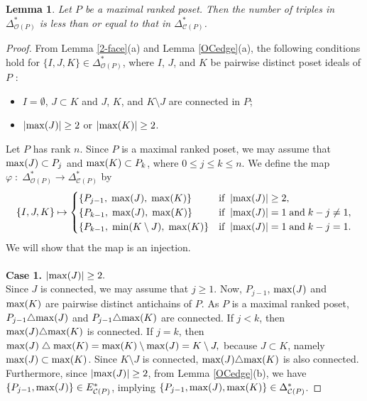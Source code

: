 \documentclass[12pt]{amsart}
\newtheorem{Lemma}[Theorem]{Lemma}
\theoremstyle{definition}
\let\phi=\varphi
\begin{document}
\begin{Lemma}\label{triangle inequality} 
Let $P$ be a maximal ranked poset.
Then the number of triples in $\Delta^{*}_{\mathcal{O}(P)}$
is less than or equal to that in $\Delta^{*}_{\mathcal{C}(P)}$.
\end{Lemma}

\begin{proof}
From Lemma \ref{2-face}(a) and Lemma \ref{OCedge}(a), the following conditions hold for $\{I,J,K\} \in \Delta^{*}_{\mathcal{O}(P)}$, where $I$, $J$, and $K$ be pairwise distinct poset ideals of $P$
:
\begin{itemize}
\item 
$I = \emptyset$, $J \subset K$ and $J$, $K$, and $K \setminus J$ are connected in $P$;
\item 
$|{\rm max}(J)| \geq 2$ or $|{\rm max}(K)| \geq 2$.
\end{itemize}
Let $P$ has rank $n$.
Since $P$ is a maximal ranked poset, we may assume that ${\rm max}(J) \subset P_j$ and ${\rm max}(K) \subset P_k$, where $0 \leq j \leq k \leq n$.
We define the map $\phi\;:\;\Delta^{*}_{\mathcal{O}(P)} \rightarrow \Delta^{*}_{\mathcal{C}(P)}$ by
\[
\{I,J,K\} \mapsto 
\begin{cases}
\{P_{j-1},\; {\rm max}(J),\; {\rm max}(K)\} & \mbox{if}\;\; |{\rm max}(J)| \geq 2,\\
\{P_{k-1},\; {\rm max}(J),\; {\rm max}(K)\} & \mbox{if}\;\; |{\rm max}(J)| = 1 \;\mbox{and}\; k-j \neq 1,\\
\{P_{k-1},\; {\rm min}(K \setminus J),\; {\rm max}(K)\} & \mbox{if}\;\; |{\rm max}(J)| = 1 \;\mbox{and}\; k-j = 1.
\end{cases}
\]
We will show that the map is an injection.
\\
\\
\medskip
\noindent
{\bf Case 1.} $|{\rm max}(J)| \geq 2.$\\
\indent
Since $J$ is connected, we may assume that $j \geq 1$.
Now, $P_{j-1}$, ${\rm max}(J)$ and ${\rm max}(K)$ are pairwise distinct antichains of $P$. 
As $P$ is a maximal ranked poset, $P_{j-1} \triangle {\rm max}(J)$ and $P_{j-1} \triangle {\rm max}(K)$ are connected.
If $j < k$, then ${\rm max}(J) \triangle {\rm max}(K)$ is connected.
If $j = k$, then ${\rm max}(J)\;\triangle\;{\rm max}(K)={\rm max }(K)\setminus{\rm max}(J)=K \setminus J,$ because $J \subset K$, namely ${\rm max}(J)\subset{\rm max}(K)$.
Since $K \setminus J$ is connected, ${\rm max}(J) \triangle {\rm max}(K)$ is  also connected. 
Furthermore, since $|{\rm max}(J)| \geq 2$, from Lemma \ref{OCedge}(b), we have $\{P_{j-1}, {\rm max}(J)\} \in E^{*}_{\mathcal{C}(P)}$, implying $\{P_{j-1},{\rm max}(J),{\rm max}(K)\} \in \Delta^{*}_{\mathcal{C}(P)}$. 



\end{proof}
\end{document}
